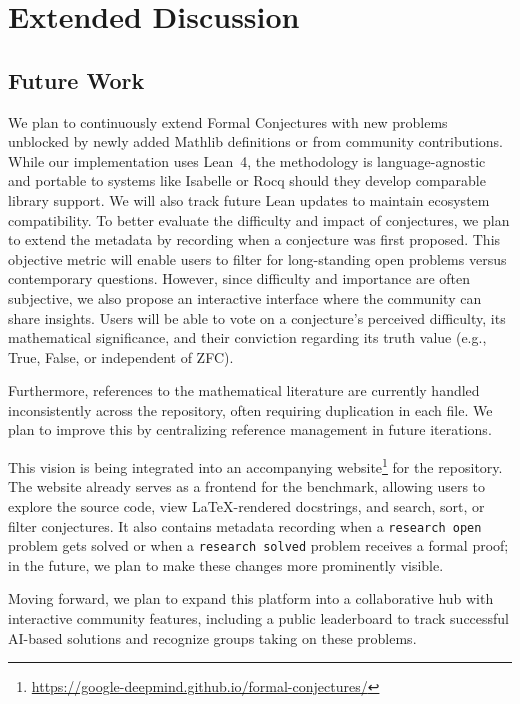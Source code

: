 \section{Extended Discussion}\label{sec:extended_discussion}

\subsection{Future Work}\label{sec:app_future_work}

We plan to continuously extend Formal Conjectures with new problems unblocked by newly added Mathlib definitions or from community contributions.
While our implementation uses Lean~4, the methodology is language-agnostic and portable to systems like Isabelle or Rocq should they develop comparable library support. We will also track future Lean updates to maintain ecosystem compatibility.
To better evaluate the difficulty and impact of conjectures, we plan to extend the metadata by recording when a conjecture was first proposed.
This objective metric will enable users to filter for long-standing open problems versus contemporary questions.
However, since difficulty and importance are often subjective, we also propose an interactive interface where the community can share insights.
Users will be able to vote on a conjecture's perceived difficulty, its mathematical significance, and their conviction regarding its truth value
(e.g., True, False, or independent of ZFC).

Furthermore, references to the mathematical literature are currently handled inconsistently across the repository, often requiring duplication in each file. We plan to improve this by centralizing reference management in future iterations.

This vision is being integrated into an accompanying website\footnote{\url{https://google-deepmind.github.io/formal-conjectures/}} for the repository.
The website already serves as a frontend for the benchmark, allowing users to explore the source code, view \LaTeX-rendered docstrings, and search, sort, or filter conjectures.
It also contains metadata recording when a \lstinline[language={}]{research open} problem gets solved or when a \lstinline[language={}]{research solved} problem receives a formal proof; in the future, we plan to make these changes more prominently visible.

Moving forward, we plan to expand this platform into a collaborative hub with interactive community features, including a public leaderboard to track successful AI-based solutions and recognize groups taking on these problems.